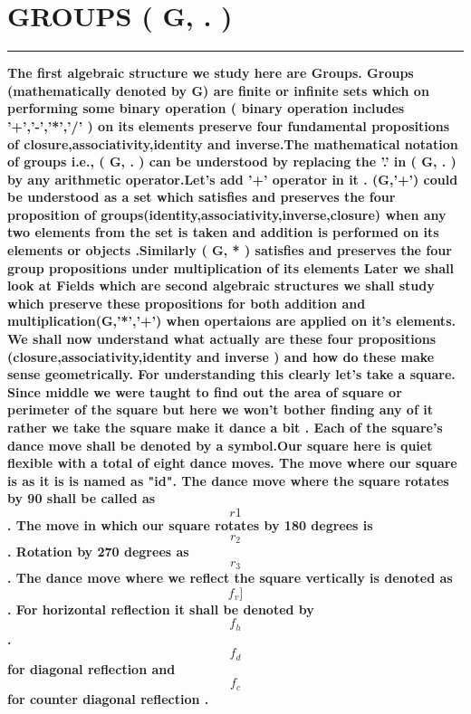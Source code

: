 \documentclass{article}
\begin{document}
\section * {GROUPS ( G, . )}
\hrule 
\bigskip
\textbf{ The first algebraic structure we study here are Groups. Groups (mathematically denoted by G) are finite or infinite sets which on performing some binary operation ( binary operation includes '+','-','*','/' ) on its elements preserve four fundamental propositions of closure,associativity,identity and inverse.The mathematical notation of groups i.e., ( G, . ) can be understood by replacing the '.' in ( G, . ) by any arithmetic operator.Let's add '+' operator in it . (G,'+') could be understood as a set which satisfies and preserves the four proposition of groups(identity,associativity,inverse,closure) when any two elements from the set is taken and addition is performed on its elements or objects .Similarly ( G, * ) satisfies and preserves the four group propositions under multiplication of  its elements 
Later we shall look at Fields which are second algebraic structures we shall study which preserve these propositions  for both addition and multiplication(G,'*','+') when opertaions are applied on it's elements.}
\\
\textbf{ We shall now understand what actually are these four propositions (closure,associativity,identity and inverse ) and how do these make sense geometrically.
For understanding this clearly let's take a square. Since middle we were taught to find out the area of square or perimeter of the square but here we won't bother finding any of it rather we take the square make it dance a bit . Each of the square's dance move shall be denoted by a symbol.Our square here is quiet flexible with a total of eight dance moves. The move where our square is as it is is named as "id". The dance move where the square rotates by 90 shall be called as \[r1\]. The move in which our square rotates by 180 degrees is \[r_2\]. Rotation by 270 degrees as \[r_3\]. The dance move where we reflect the square vertically is denoted as \[f_v]\]. For horizontal reflection it shall be denoted by \[f_h\]. \[f_d\] for diagonal reflection and \[f_c\] for counter diagonal reflection .}
\\
\\
\\
\pagebreak
\end{document}
